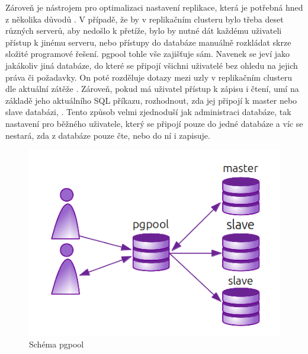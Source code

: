 Zároveň je nástrojem pro optimalizaci nastavení replikace, která je potřebná hned z několika důvodů \citep{pgpool2014}. V případě, že by v replikačním clusteru bylo třeba deset různých serverů, aby nedošlo k přetíže, bylo by nutné dát každému uživateli přístup k jinému serveru, nebo přístupy do databáze manuálně rozkládat skrze složité programové řešení. pgpool tohle vše zajišťuje sám. Navenek se jeví jako jakákoliv jiná databáze, do které se připojí všichni uživatelé bez ohledu na jejich práva či požadavky. On poté rozděluje dotazy mezi uzly v replikačním clusteru dle aktuální zátěže \citep{Boszormenyi2013}. Zároveň, pokud má uživatel přístup k zápisu i čtení, umí na základě jeho aktuálního SQL příkazu, rozhodnout, zda jej připojí k master nebo slave databázi, . Tento způsob velmi zjednoduší jak administraci databáze, tak nastavení pro běžného uživatele, který se připojí pouze do jedné databáze a víc se nestará, zda z databáze pouze čte, nebo do ní i zapisuje. 
      \begin{figure}[H]
        \centering
        \includegraphics[scale=1]{../../../grafy/obr/schema_pgpool.png}
        \caption{Schéma pgpool}
        \label{opgpool}
      \end{figure}

